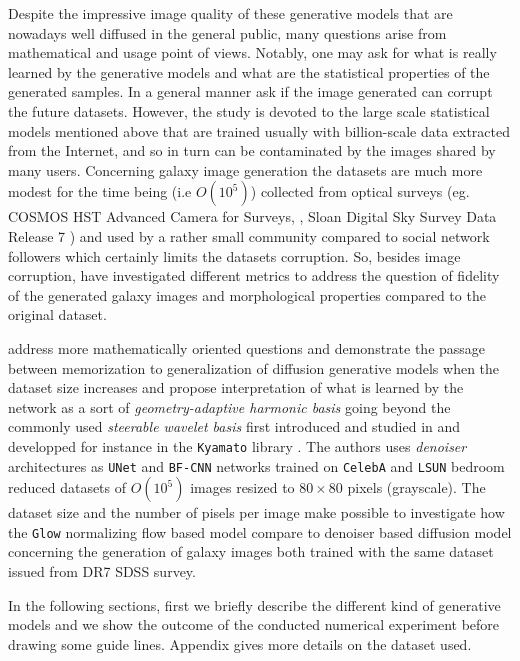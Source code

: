 \documentclass[11pt]{amsart}
\begin{document}
Despite the impressive image quality of these generative models that are nowadays well diffused in the general public, many questions arise from mathematical and usage point of views. Notably, one may ask for what is really learned by the generative models and what are the statistical properties of the generated samples. In a general manner \cite{Hataya2023} ask if the image generated can corrupt the future datasets. However, the study is devoted  to the large scale statistical models mentioned above that are trained usually with billion-scale data extracted from the Internet, and so in turn can be contaminated by the images shared by many users. Concerning galaxy image generation the datasets are much more modest for the time being (i.e $O(10^5)$) collected from optical surveys (eg. COSMOS HST Advanced Camera for Surveys, \cite{mandelbaum_2019_3242143},  Sloan Digital Sky Survey \citep[SDSS;][]{sdss} Data Release 7 \citep{sdssdr7}) and used by a rather small community compared to social network followers which certainly  limits the datasets corruption. So, besides image corruption, \cite{HACKSTEIN2023100685,janulewicz2024assessing} have investigated different metrics to address the question of fidelity of the generated galaxy images and morphological properties compared to the original dataset.

\cite{kadkhodaie2024generalization} address more mathematically oriented questions and demonstrate the passage between memorization to generalization of  diffusion generative models when the dataset size increases and propose interpretation of what is learned by the network as a sort of \textit{geometry-adaptive harmonic basis} going beyond the commonly used \textit{steerable wavelet basis} first introduced and studied in \cite{Simoncelli1995b,Unser2013} and developped for instance in the \texttt{Kyamato} library \citep{JMLR:v21:19-047}. The authors uses \textit{denoiser} architectures as \texttt{UNet} \citep{2015arXiv150504597R} and \texttt{BF-CNN} networks \citep{Mohan2020Robust} trained on \texttt{CelebA} \citep{Liu2015} and \texttt{LSUN} bedroom  \citep{Yu2015} reduced datasets of $O(10^5)$ images resized to $80\times 80$ pixels (grayscale). The dataset size and the number of pisels per image make possible to investigate how the \texttt{Glow} normalizing flow based model compare to denoiser based diffusion model concerning the generation of galaxy images both trained with the same dataset issued from DR7 SDSS survey.


In the following sections, first we briefly describe the different kind of generative models and we show the outcome of the conducted numerical experiment before drawing some guide lines. Appendix gives more details on the dataset used.
%
\end{document}
